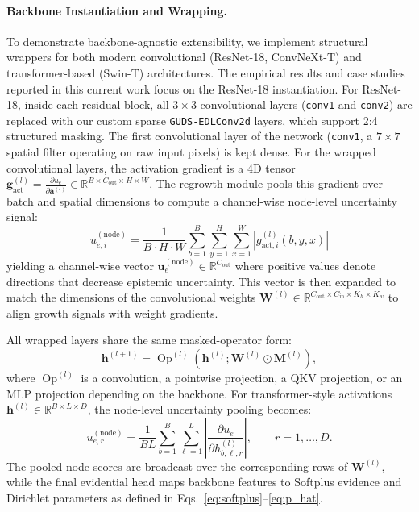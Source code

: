 \documentclass[letterpaper]{article} %
\newcommand{\R}{\mathbb{R}}
\begin{document}
\paragraph{Backbone Instantiation and Wrapping.}
To demonstrate backbone-agnostic extensibility, we implement structural wrappers for both modern convolutional (ResNet-18, ConvNeXt-T) and transformer-based (Swin-T) architectures. The empirical results and case studies reported in this current work focus on the ResNet-18 instantiation. For ResNet-18, inside each residual block, all $3 \times 3$ convolutional layers (\texttt{conv1} and \texttt{conv2}) are replaced with our custom sparse \texttt{GUDS-EDLConv2d} layers, which support 2:4 structured masking. The first convolutional layer of the network (\texttt{conv1}, a $7 \times 7$ spatial filter operating on raw input pixels) is kept dense. For the wrapped convolutional layers, the activation gradient is a 4D tensor $\bm{g}_{\text{act}}^{(l)} = \frac{\partial \bar{u}_e}{\partial \bm{a}^{(l)}} \in \R^{B \times C_{\text{out}} \times H \times W}$. The regrowth module pools this gradient over batch and spatial dimensions to compute a channel-wise node-level uncertainty signal:
\begin{equation}\label{eq:conv_pooling_main}
    u_{e,i}^{(\text{node})} = \frac{1}{B \cdot H \cdot W} \sum_{b=1}^B \sum_{y=1}^H \sum_{x=1}^W \left| g_{\text{act}, i}^{(l)}(b, y, x) \right|
\end{equation}
yielding a channel-wise vector $\bm{u}_e^{(\text{node})} \in \R^{C_{\text{out}}}$ where positive values denote directions that decrease epistemic uncertainty. This vector is then expanded to match the dimensions of the convolutional weights $\bm{W}^{(l)} \in \R^{C_{\text{out}} \times C_{\text{in}} \times K_h \times K_w}$ to align growth signals with weight gradients.

All wrapped layers share the same masked-operator form:
\begin{equation}\label{eq:wrapped_layer}
    \bm{h}^{(l+1)}
    = \operatorname{Op}^{(l)}\!\left(\bm{h}^{(l)};
    \bm{W}^{(l)}\odot\bm{M}^{(l)}\right),
\end{equation}
where $\operatorname{Op}^{(l)}$ is a convolution, a pointwise projection, a QKV projection, or an MLP projection depending on the backbone. For transformer-style activations $\bm{h}^{(l)}\in\R^{B\times L\times D}$, the node-level uncertainty pooling becomes:
\begin{equation}\label{eq:linear_pooling_main}
    u_{e,r}^{(\text{node})}
    = \frac{1}{B L}\sum_{b=1}^{B}\sum_{\ell=1}^{L}
    \left|
    \frac{\partial \bar{u}_e}{\partial h_{b,\ell,r}^{(l)}}
    \right|,
    \qquad r=1,\ldots,D .
\end{equation}
The pooled node scores are broadcast over the corresponding rows of $\bm{W}^{(l)}$, while the final evidential head maps backbone features to Softplus evidence and Dirichlet parameters as defined in Eqs.~\ref{eq:softplus}--\ref{eq:p_hat}.
\end{document}
